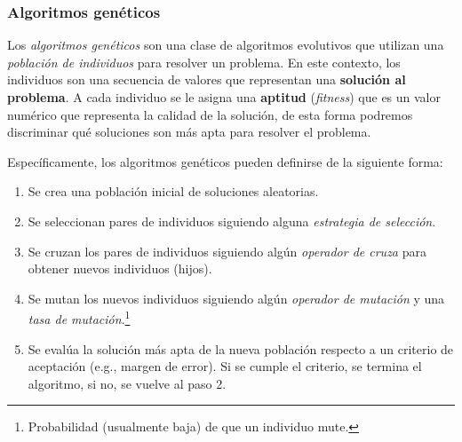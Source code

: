 \subsubsection{Algoritmos genéticos}
  Los \textit{algoritmos genéticos}\cite{holland_adaptation_1992, ahvanooey_survey_2019} son una 
  clase de algoritmos evolutivos que utilizan una \textit{población de individuos} para resolver un 
  problema.
  En este contexto, los individuos son una secuencia de valores que representan una 
  \textbf{solución al problema}.
  A cada individuo se le asigna una \textbf{aptitud} (\textit{fitness}) que es un valor numérico que 
  representa la calidad de la solución, de esta forma podremos discriminar qué soluciones son más
  apta para resolver el problema.

  Específicamente, los algoritmos genéticos pueden definirse de la siguiente forma:
  \begin{enumerate}
    \item Se crea una población inicial de soluciones aleatorias.
    \item Se seleccionan pares de individuos siguiendo alguna \textit{estrategia de 
      selección}.
    \item Se cruzan los pares de individuos siguiendo algún \textit{operador de cruza} para 
      obtener nuevos individuos (hijos).
    \item Se mutan los nuevos individuos siguiendo algún \textit{operador de mutación} y una 
      \textit{tasa de mutación}.\footnote{Probabilidad (usualmente baja) de que un individuo mute.}
    \item Se evalúa la solución más apta de la nueva población respecto a un criterio de aceptación
      (e.g., margen de error).
      Si se cumple el criterio, se termina el algoritmo, si no, se vuelve al paso 2.
  \end{enumerate}
  